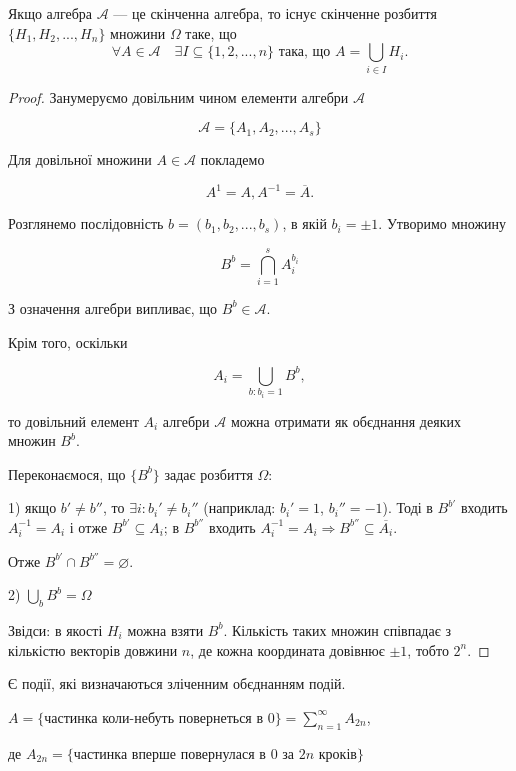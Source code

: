 \begin{lemma}
    Якщо алгебра $\mathcal{A}$ --- це скінченна алгебра, то
    існує скінченне розбиття $\{ H_1, H_2, ..., H_n\}$ множини
    $\Omega$ таке, що
    $$\forall A \in \mathcal{A} \quad \exists I \subseteq \{1, 2, ..., n\}
    \text{ така, що } A = \bigcup\limits_{i \in I} H_i.$$
\end{lemma}
\begin{proof}
    Занумеруємо довільним чином елементи алгебри $\mathcal{A}$

    $$\mathcal{A} = \{A_1, A_2, ..., A_s\}$$

    Для довільної множини $A \in \mathcal{A}$ покладемо
    
    $$A^{1} = A, A^{-1} = \overline{A}.$$
    
    Розглянемо послідовність $b = (b_1, b_2, ..., b_s)$, в якій
    $b_i = \pm 1$. Утворимо множину
    
    $$B^{b} = \bigcap\limits_{i = 1}^{s} A_i^{b_i}$$
    
    З означення алгебри випливає, що $B^b \in \mathcal{A}$.
    
    Крім того, оскільки 
    
    $$A_i = \bigcup\limits_{b: b_i = 1} B^b,$$
    
    то довільний елемент $A_i$ алгебри $\mathcal{A}$ можна
    отримати як обєднання деяких множин $B^b$.
    
    Переконаємося, що $\{B^b\}$ задає розбиття $\Omega$:

    1) якщо $b' \neq b''$, то $\exists i: b_i' \neq b_i''$ (наприклад:
    $b_i' = 1$, $b_i'' = -1$). Тоді в $B^{b'}$ входить $A_i^{-1} = A_i$
    і отже $B^{b'} \subseteq A_i$; в $B^{b''}$ входить $A_i^{-1} = A_i
    \Rightarrow B^{b''} \subseteq \overline{A_i}$.
    
    Отже $B^{b'} \cap B^{b''} = \varnothing$.
    
    2) $\bigcup\limits_{b} B^b = \Omega$
    
    Звідси: в якості $H_i$ можна взяти $B^{b}$. Кількість таких
    множин співпадає з кількістю векторів довжини $n$, де кожна
    координата довівнює $\pm 1$, тобто $2^n$.
\end{proof}

Є події, які визначаються зліченним обєднанням подій.

\begin{example}
    $A = \{$частинка коли-небуть повернеться в 0$\}
    = \sum\limits_{n=1}^{\infty} A_{2n}$,
    
    де $A_{2n} = \{$частинка вперше повернулася в 0 за $2n$ кроків$\}$
\end{example}


